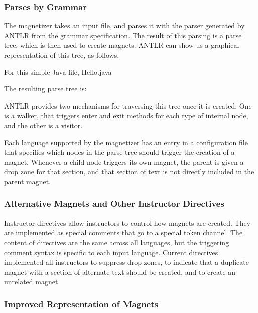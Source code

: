 \documentclass[letter,10pt]{article}
\begin{document}
\subsubsection{Parses by Grammar}

The magnetizer takes an input file, and parses it with the parser 
generated by ANTLR from the grammar specification. The result of this 
parsing is a parse tree, which is then used to create magnets. ANTLR 
can show us a graphical representation of this tree, as follows.

For this simple Java file, Hello.java

The resulting parse tree is:

\label{fig:parseTree}

ANTLR provides two mechanisms for traversing this tree once it is 
created. One is a walker, that triggers enter and exit methods for each 
type of internal node, and the other is a visitor.

Each language supported by the magnetizer has an entry in a 
configuration file that specifies which nodes in the parse tree should 
trigger the creation of a magnet. Whenever a child node triggers its 
own magnet, the parent is given a drop zone for that section, and that 
section of text is not directly included in the parent magnet.




\subsubsection{Alternative Magnets and Other Instructor Directives}

Instructor directives allow instructors to control how magnets are 
created. They are implemented as special comments that go to a 
special token channel. The content of directives are the same across all 
languages, but the triggering comment syntax is specific to each input 
language. Current directives implemented all instructors to suppress 
drop zones, to indicate that a duplicate magnet with a section of 
alternate text should be created, and to create an unrelated magnet.


\subsubsection{Improved Representation of Magnets}
\end{document}
